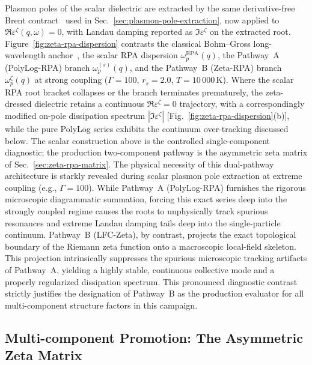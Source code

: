 \documentclass[aps,showkeys,noshowpacs,superscriptaddress,pre,preprint]{revtex4-2}
\let\label\orilabel
\begin{document}
Plasmon poles of the scalar dielectric are extracted by the same derivative-free Brent contract~\cite{Brent1973}
used in Sec.~\ref{sec:plasmon-pole-extraction}, now applied to $\Re\varepsilon^{\zeta}(q,\omega)=0$,
with Landau damping reported as $\Im\varepsilon^{\zeta}$ on the extracted root.
Figure~\ref{fig:zeta-rpa-dispersion} contrasts the classical Bohm--Gross long-wavelength anchor~\cite{Bohm-Gross1949},
the scalar RPA dispersion $\omega_p^{\mathrm{RPA}}(q)$, the Pathway~A (PolyLog-RPA) branch $\omega_p^{(s)}(q)$,
and the Pathway~B (Zeta-RPA) branch $\omega_p^{\zeta}(q)$
at strong coupling ($\Gamma=100$, $r_s=2.0$, $T=10\,000\,\mathrm{K}$).
Where the scalar RPA root bracket collapses or the branch terminates prematurely,
the zeta-dressed dielectric retains a continuous $\Re\varepsilon^{\zeta}=0$ trajectory,
with a correspondingly modified on-pole dissipation spectrum
$|\Im\varepsilon^{\zeta}|$ [Fig.~\ref{fig:zeta-rpa-dispersion}(b)],
while the pure PolyLog series exhibits the continuum over-tracking discussed below.
The scalar construction above is the controlled single-component diagnostic;
the production two-component pathway is the asymmetric zeta matrix of
Sec.~\ref{sec:zeta-rpa-matrix}.
The physical necessity of this dual-pathway architecture is starkly revealed during scalar plasmon pole extraction at extreme coupling (e.g., $\Gamma=100$).
While Pathway~A (PolyLog-RPA) furnishes the rigorous microscopic diagrammatic summation, forcing this exact series deep into the strongly coupled regime causes the roots to unphysically track spurious resonances and extreme Landau damping tails deep into the single-particle continuum.
Pathway~B (LFC-Zeta), by contrast, projects the exact topological boundary of the Riemann zeta function onto a macroscopic local-field skeleton.
This projection intrinsically suppresses the spurious microscopic tracking artifacts of Pathway~A, yielding a highly stable, continuous collective mode and a properly regularized dissipation spectrum.
This pronounced diagnostic contrast strictly justifies the designation of Pathway~B as the production evaluator for all multi-component structure factors in this campaign.

\subsection{Multi-component Promotion: The Asymmetric Zeta Matrix}
\label{sec:zeta-rpa-matrix}
\end{document}
